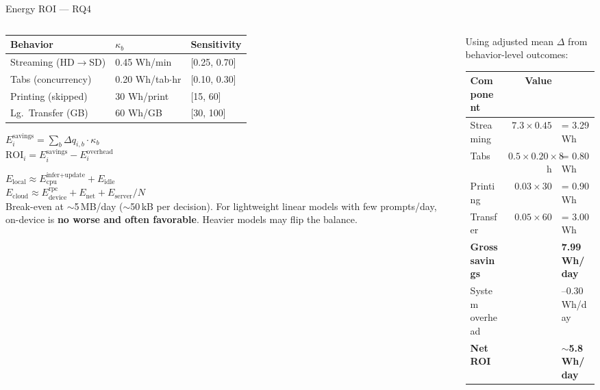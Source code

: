 \documentclass[10pt,aspectratio=169]{beamer}
\newcommand{\emphmark}[1]{\textcolor{chiAccent}{\textbf{#1}}}
\begin{document}

\begin{frame}{Energy ROI --- RQ4}
\begin{columns}[T]
\begin{column}{0.50\textwidth}
\begin{keybox}
\tiny
\renewcommand{\arraystretch}{1.15}
\begin{tabular}{@{}lll@{}}
\toprule
\textbf{Behavior} & \textbf{$\kappa_b$} & \textbf{Sensitivity} \\
\midrule
Streaming (HD$\to$SD) & 0.45 Wh/min & [0.25, 0.70] \\
Tabs (concurrency) & 0.20 Wh/tab$\cdot$hr & [0.10, 0.30] \\
Printing (skipped) & 30 Wh/print & [15, 60] \\
Lg.\ Transfer (GB) & 60 Wh/GB & [30, 100] \\
\bottomrule
\end{tabular}
\vspace{1pt}
$E_i^{\text{savings}} = \sum_b \Delta q_{i,b} \cdot \kappa_b$\\[2pt]
$\mathrm{ROI}_i = E_i^{\text{savings}} - E_i^{\text{overhead}}$
\end{keybox}
\vspace{3pt}
\begin{alertbox}
\tiny
$E_{\text{local}} \approx E_{\text{cpu}}^{\text{infer+update}} + E_{\text{idle}}$\\[2pt]
$E_{\text{cloud}} \approx E_{\text{device}}^{\text{rpc}} + E_{\text{net}} + E_{\text{server}}/N$\\[3pt]
Break-even at $\sim$5\,MB/day ($\sim$50\,kB per decision). For lightweight linear models with few prompts/day, on-device is \emphmark{no worse and often favorable}. Heavier models may flip the balance.
\end{alertbox}
\end{column}
\begin{column}{0.48\textwidth}
\begin{keybox}
\tiny
Using adjusted mean $\Delta$ from behavior-level outcomes:
\vspace{1pt}
\renewcommand{\arraystretch}{1.15}
\begin{tabular}{@{}lrl@{}}
\toprule
\textbf{Component} & \textbf{Value} & \\
\midrule
Streaming & $7.3 \times 0.45$ & = 3.29 Wh \\
Tabs & $0.5 \times 0.20 \times 8$h & = 0.80 Wh \\
Printing & $0.03 \times 30$ & = 0.90 Wh \\
Transfer & $0.05 \times 60$ & = 3.00 Wh \\
\midrule
\textbf{Gross savings} & & \textbf{7.99 Wh/day}\\
System overhead & & --0.30 Wh/day \\
\midrule
\textbf{Net ROI} & & \emphmark{$\sim$5.8 Wh/day} \\
\bottomrule
\end{tabular}


\end{keybox}
\end{column}
\end{columns}
\end{frame}
\end{document}
